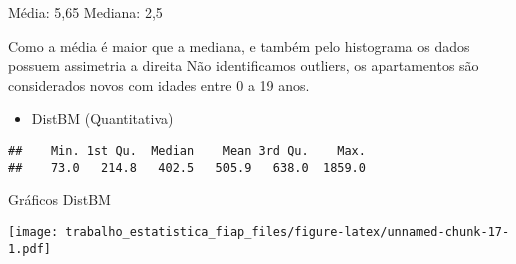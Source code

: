 \documentclass[
]{article}
\newenvironment{Shaded}{\begin{snugshade}}{\end{snugshade}}
\newcommand{\AttributeTok}[1]{\textcolor[rgb]{0.77,0.63,0.00}{#1}}
\newcommand{\CommentTok}[1]{\textcolor[rgb]{0.56,0.35,0.01}{\textit{#1}}}
\newcommand{\DecValTok}[1]{\textcolor[rgb]{0.00,0.00,0.81}{#1}}
\newcommand{\FloatTok}[1]{\textcolor[rgb]{0.00,0.00,0.81}{#1}}
\newcommand{\FunctionTok}[1]{\textcolor[rgb]{0.00,0.00,0.00}{#1}}
\newcommand{\NormalTok}[1]{#1}
\newcommand{\OtherTok}[1]{\textcolor[rgb]{0.56,0.35,0.01}{#1}}
\newcommand{\SpecialCharTok}[1]{\textcolor[rgb]{0.00,0.00,0.00}{#1}}
\providecommand{\tightlist}{%
  \setlength{\itemsep}{0pt}\setlength{\parskip}{0pt}}
\begin{document}
Média: 5,65 Mediana: 2,5

Como a média é maior que a mediana, e também pelo histograma os dados
possuem assimetria a direita Não identificamos outliers, os apartamentos
são considerados novos com idades entre 0 a 19 anos.

\begin{itemize}
\tightlist
\item
  DistBM (Quantitativa)
\end{itemize}

\begin{Shaded}
\end{Shaded}

\begin{verbatim}
##    Min. 1st Qu.  Median    Mean 3rd Qu.    Max. 
##    73.0   214.8   402.5   505.9   638.0  1859.0
\end{verbatim}

\begin{Shaded}
\end{Shaded}

Gráficos DistBM

\begin{Shaded}
\end{Shaded}

\texttt{[image: trabalho\_estatistica\_fiap\_files/figure-latex/unnamed-chunk-17-1.pdf]}

\begin{Shaded}
\end{Shaded}
\end{document}
